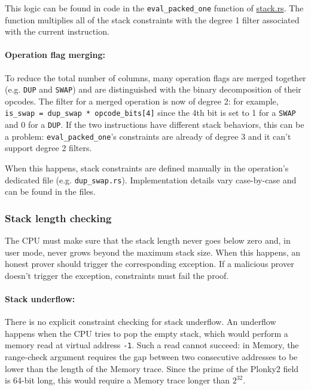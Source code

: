 This logic can be found in code in the \texttt{eval\_packed\_one} function of \href{https://github.com/0xPolygonZero/plonky2/blob/main/evm/src/cpu/stack.rs}{stack.rs}.
The function multiplies all of the stack constraints with the degree 1 filter associated with the current instruction.

\paragraph*{Operation flag merging:}

To reduce the total number of columns, many operation flags are merged together (e.g. \texttt{DUP} and \texttt{SWAP}) and are distinguished with the binary decomposition of their opcodes.
The filter for a merged operation is now of degree 2: for example, \texttt{is\_swap = dup\_swap * opcode\_bits[4]} since the 4th bit is set to 1 for a \texttt{SWAP} and 0 for a \texttt{DUP}.
If the two instructions have different stack behaviors, this can be a problem: \texttt{eval\_packed\_one}'s constraints are already of degree 3 and it can't support degree 2 filters.

When this happens, stack constraints are defined manually in the operation's dedicated file (e.g. \texttt{dup\_swap.rs}). Implementation details vary case-by-case and can be found in the files.

\subsubsection{Stack length checking}

The CPU must make sure that the stack length never goes below zero and, in user mode, never grows beyond the maximum stack size. When this happens, an honest prover should trigger the
corresponding exception. If a malicious prover doesn't trigger the exception, constraints must fail the proof.

\paragraph*{Stack underflow:}
There is no explicit constraint checking for stack underflow. An underflow happens when the CPU tries to pop the empty stack, which would perform a memory read at virtual address \texttt{-1}.
Such a read cannot succeed: in Memory, the range-check argument requires the gap between two consecutive addresses to be lower than the length of the Memory trace. Since the prime of the Plonky2 field is 64-bit long,
this would require a Memory trace longer than $2^{32}$.

